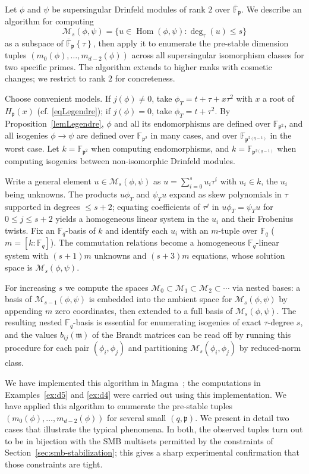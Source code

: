 \documentclass[12pt]{amsart}
\theoremstyle{definition}
\theoremstyle{remark}
\numberwithin{equation}{section}
\numberwithin{thm}{section}
\DeclareMathOperator{\Hom}{Hom}
\newcommand{\fm}{\mathfrak{m}}
\newcommand{\fp}{\mathfrak{p}}
\newcommand{\cM}{\mathcal{M}}
\newcommand{\F}{\mathbb{F}}
\newcommand{\oF}{\overline{\F}}
\newcommand{\twist}[1]{#1\!\left\{\tau\right\}}
\begin{document}
Let $\phi$ and $\psi$ be supersingular Drinfeld modules of rank $2$ over $\oF_\fp$. We describe an algorithm for computing
\[
\cM_s(\phi,\psi) = \{u \in \Hom(\phi,\psi) : \deg_\tau(u) \leq s\}
\]
as a subspace of $\twist{\oF_\fp}$, then apply it to enumerate the pre-stable dimension tuples $(m_0(\phi),\ldots,m_{d-2}(\phi))$ across all supersingular isomorphism classes for two specific primes. The algorithm extends to higher ranks with cosmetic changes; we restrict to rank $2$ for concreteness.

Choose convenient models. If $j(\phi) \neq 0$, take $\phi_T = t + \tau + x\tau^2$ with $x$ a root of $H_\fp(x)$ (cf. \eqref{eqLegendre}); if $j(\phi) = 0$, take $\phi_T = t + \tau^2$. By Proposition~\ref{lemLegendre}, $\phi$ and all its endomorphisms are defined over $\F_{\fp^2}$, and all isogenies $\phi \to \psi$ are defined over $\F_{\fp^2}$ in many cases, and over $\F_{\fp^{2(q-1)}}$ in the worst case. Let $k = \F_{\fp^2}$ when computing endomorphisms, and $k = \F_{\fp^{2(q-1)}}$ when computing isogenies between non-isomorphic Drinfeld modules.

Write a general element $u \in \cM_s(\phi,\psi)$ as $u = \sum_{i=0}^s u_i\tau^i$ with $u_i \in k$, the $u_i$ being unknowns. The products $u\phi_T$ and $\psi_T u$ expand as skew polynomials in $\tau$ supported in degrees $\leq s+2$; equating coefficients of $\tau^j$ in $u\phi_T = \psi_T u$ for $0 \leq j \leq s+2$ yields a homogeneous linear system in the $u_i$ and their Frobenius twists. Fix an $\F_q$-basis of $k$ and identify each $u_i$ with an $m$-tuple over $\F_q$ ($m = [k:\F_q]$). The commutation relations become a homogeneous $\F_q$-linear system with $(s+1)m$ unknowns and $(s+3)m$ equations, whose solution space is $\cM_s(\phi,\psi)$.

For increasing $s$ we compute the spaces $\cM_0 \subset \cM_1 \subset \cM_2 \subset \cdots$ via nested bases: a basis of $\cM_{s-1}(\phi,\psi)$ is embedded into the ambient space for $\cM_s(\phi,\psi)$ by appending $m$ zero coordinates, then extended to a full basis of $\cM_s(\phi,\psi)$. The resulting nested $\F_q$-basis is essential for enumerating isogenies of exact $\tau$-degree $s$, and the values $b_{ij}(\fm)$ of the Brandt matrices can be read off by running this procedure for each pair $(\phi_i,\phi_j)$ and partitioning $\cM_s(\phi_i,\phi_j)$ by reduced-norm class.

We have implemented this algorithm in Magma~\cite{Magma}; the computations in Examples~\ref{ex:d5} and \ref{ex:d4} were carried out using this implementation. We have applied this algorithm to enumerate the pre-stable tuples $(m_0(\phi),\ldots,m_{d-2}(\phi))$ for several small $(q,\fp)$. We present in detail two cases that illustrate the typical phenomena. In both, the observed tuples turn out to be in bijection with the SMB multisets permitted by the constraints of Section~\ref{sec:smb-stabilization}; this gives a sharp experimental confirmation that those constraints are tight.
\end{document}
